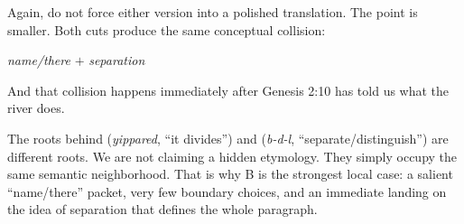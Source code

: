 
Again, do not force either version into a polished translation. The point is smaller. Both cuts produce the same conceptual collision:

\begin{center}
\textit{name/there} $+$ \textit{separation}
\end{center}

And that collision happens immediately after Genesis 2:10 has told us what the river does.


The roots behind  (\textit{yippared}, ``it divides'') and  (\textit{b-d-l}, ``separate/distinguish'') are different roots. We are not claiming a hidden etymology. They simply occupy the same semantic neighborhood. That is why B is the strongest local case: a salient ``name/there'' packet, very few boundary choices, and an immediate landing on the idea of separation that defines the whole paragraph.

